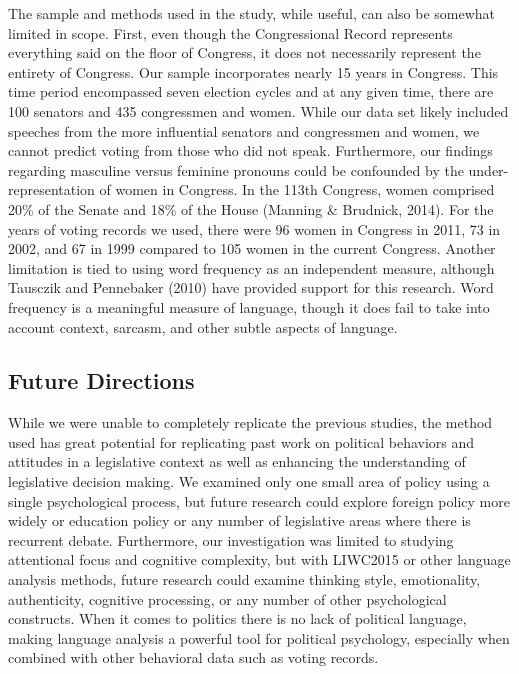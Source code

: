 \documentclass[english,,man,floatsintext]{apa6}
\begin{document}
The sample and methods used in the study, while useful, can also be somewhat limited in scope. First, even though the Congressional Record represents everything said on the floor of Congress, it does not necessarily represent the entirety of Congress. Our sample incorporates nearly 15 years in Congress. This time period encompassed seven election cycles and at any given time, there are 100 senators and 435 congressmen and women. While our data set likely included speeches from the more influential senators and congressmen and women, we cannot predict voting from those who did not speak. Furthermore, our findings regarding masculine versus feminine pronouns could be confounded by the under-representation of women in Congress. In the 113th Congress, women comprised 20\% of the Senate and 18\% of the House (Manning \& Brudnick, 2014). For the years of voting records we used, there were 96 women in Congress in 2011, 73 in 2002, and 67 in 1999 compared to 105 women in the current Congress. Another limitation is tied to using word frequency as an independent measure, although Tausczik and Pennebaker (2010) have provided support for this research. Word frequency is a meaningful measure of language, though it does fail to take into account context, sarcasm, and other subtle aspects of language.

\hypertarget{future-directions}{%
\subsection{Future Directions}\label{future-directions}}

While we were unable to completely replicate the previous studies, the method used has great potential for replicating past work on political behaviors and attitudes in a legislative context as well as enhancing the understanding of legislative decision making. We examined only one small area of policy using a single psychological process, but future research could explore foreign policy more widely or education policy or any number of legislative areas where there is recurrent debate. Furthermore, our investigation was limited to studying attentional focus and cognitive complexity, but with LIWC2015 or other language analysis methods, future research could examine thinking style, emotionality, authenticity, cognitive processing, or any number of other psychological constructs. When it comes to politics there is no lack of political language, making language analysis a powerful tool for political psychology, especially when combined with other behavioral data such as voting records.
\end{document}
